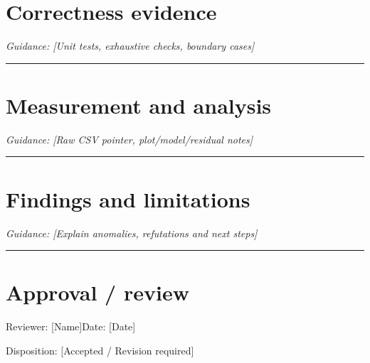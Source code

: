 \documentclass[11pt]{article}
\begin{document}
\section{Correctness evidence}
\noindent\textit{Guidance: [Unit tests, exhaustive checks, boundary cases]}\par\vspace{0.9cm}\hrule\vspace{0.25cm}
\section{Measurement and analysis}
\noindent\textit{Guidance: [Raw CSV pointer, plot/model/residual notes]}\par\vspace{0.9cm}\hrule\vspace{0.25cm}
\section{Findings and limitations}
\noindent\textit{Guidance: [Explain anomalies, refutations and next steps]}\par\vspace{0.9cm}\hrule\vspace{0.25cm}
\section{Approval / review}
\noindent Reviewer: [Name]\quad Date: [Date]\par
\noindent Disposition: [Accepted / Revision required]\par\vspace{0.4cm}
\end{document}
